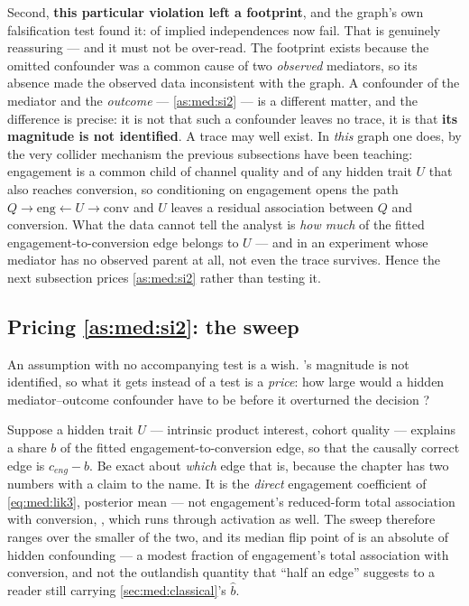 Second, \textbf{this particular violation left a footprint}, and the graph's own falsification test
found it: \nbFourBadImpViolations{} of \nbFourBadImpTests{} implied independences now fail. That is
genuinely reassuring --- and it must not be over-read. The footprint exists because the omitted
confounder was a common cause of two \emph{observed} mediators, so its absence made the observed data
inconsistent with the graph. A confounder of the mediator and the \emph{outcome} ---
\cref{as:med:si2} --- is a different matter, and the difference is precise: it is not that such a
confounder leaves no trace, it is that \textbf{its magnitude is not identified}. A trace may well
exist. In \emph{this} graph one does, by the very collider mechanism the previous subsections have
been teaching: engagement is a common child of channel quality and of any hidden trait $U$ that also
reaches conversion, so conditioning on engagement opens the path
$Q \to \text{eng} \leftarrow U \to \text{conv}$ and $U$ leaves a residual association between $Q$ and
conversion. What the data cannot tell the analyst is \emph{how much} of the fitted
engagement-to-conversion edge belongs to $U$ --- and in an experiment whose mediator has no observed
parent at all, not even the trace survives. Hence the next subsection prices \cref{as:med:si2}
rather than testing it.



\subsection*{Pricing \texorpdfstring{\cref{as:med:si2}}{Assumption 6.2}: the sweep}

An assumption with no accompanying test is a wish. 's magnitude is not identified,
so what it gets instead of a test is a \emph{price}: how large would a hidden mediator--outcome
confounder have to be before it overturned the decision \citep{imai2010, cinelli2020}?

Suppose a hidden trait $U$ --- intrinsic product interest, cohort quality --- explains a share $b$ of
the fitted engagement-to-conversion edge, so that the causally correct edge is $c_{eng} - b$. Be
exact about \emph{which} edge that is, because the chapter has two numbers with a claim to the name.
It is the \emph{direct} engagement coefficient of \cref{eq:med:lik3}, posterior mean
\nbFourEdgeFitted{} --- not engagement's reduced-form total association with conversion,
\nbFourBlockingBOk, which runs through activation as well. The sweep therefore ranges over the
smaller of the two, and its median flip point of \pc{\nbFourFlipMed} is an absolute
\nbFourFlipAbs{} of hidden confounding --- a modest fraction of engagement's \nbFourBlockingBOk{}
total association with conversion, and not the outlandish quantity that ``half an edge'' suggests to
a reader still carrying \cref{sec:med:classical}'s $\hat b$.

